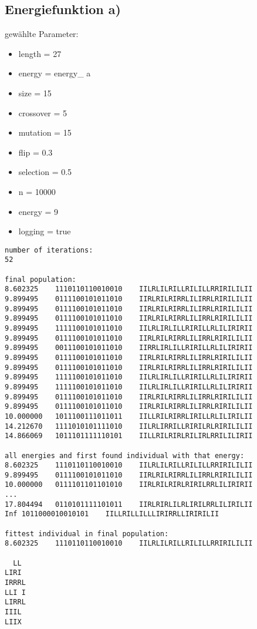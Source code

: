 \documentclass[a4paper,10pt,fleqn]{scrartcl}
\begin{document}
\subsection{Energiefunktion a)} 
gewählte Parameter:
\begin{itemize}
\item length = 27
\item energy = energy\_ a
\item size = 15
\item crossover = 5
\item mutation = 15
\item flip = 0.3
\item selection =  0.5
\item n = 10000
\item energy = 9
\item logging = true
\end{itemize}
\begin{lstlisting}
number of iterations:
52

final population:
8.602325	1110110110010010	IILRLILRILLRILILLRRIRILILII
9.899495	0111100101011010	IIRLRILRIRRLILIRRLRIRILILII
9.899495	0111100101011010	IIRLRILRIRRLILIRRLRIRILILII
9.899495	0111100101011010	IIRLRILRIRRLILIRRLRIRILILII
9.899495	1111100101011010	IILRLIRLILLRIRILLRLILIRIRII
9.899495	0111100101011010	IIRLRILRIRRLILIRRLRIRILILII
9.899495	0011100101011010	IIRRLIRLILLRIRILLRLILIRIRII
9.899495	0111100101011010	IIRLRILRIRRLILIRRLRIRILILII
9.899495	0111100101011010	IIRLRILRIRRLILIRRLRIRILILII
9.899495	1111100101011010	IILRLIRLILLRIRILLRLILIRIRII
9.899495	1111100101011010	IILRLIRLILLRIRILLRLILIRIRII
9.899495	0111100101011010	IIRLRILRIRRLILIRRLRIRILILII
9.899495	0111100101011010	IIRLRILRIRRLILIRRLRIRILILII
10.000000	1011100111011011	IILLRILRIRRLIRILLRLILIRILII
14.212670	1111010101111010	IILRLIRRILLRIRILRLRIRILILII
14.866069	1011101111110101	IILLRILRIRLRILIRLRRILILIRII

all energies and first found individual with that energy:
8.602325	1110110110010010	IILRLILRILLRILILLRRIRILILII
9.899495	0111100101011010	IIRLRILRIRRLILIRRLRIRILILII
10.000000	0111101101101010	IIRLRILRIRLRIRILRRLILIRIRII
...
17.804494	0110101111101011	IIRLRIRLILRLIRILRRLILIRILII
Inf	1011000010010101	IILLRILLILLLIRIRRLLIRIRILII

fittest individual in final population:
8.602325	1110110110010010	IILRLILRILLRILILLRRIRILILII

  LL 
LIRI 
IRRRL
LLI I
LIRRL
IIIL 
LIIX 
\end{lstlisting}
\end{document}
